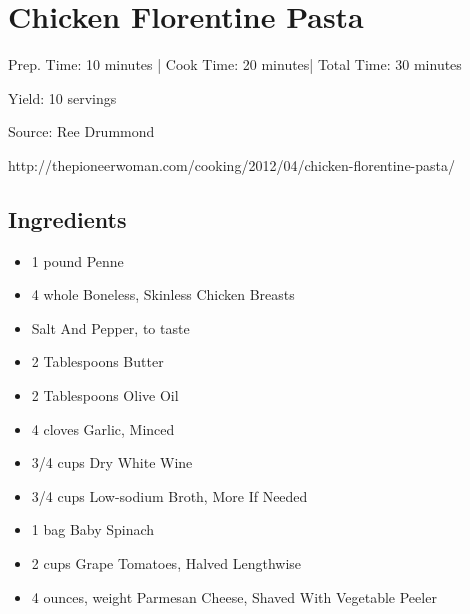 \section{Chicken Florentine Pasta}

\begin{center}
Prep. Time: 10 minutes |
Cook Time: 20 minutes|
Total Time: 30 minutes
 
Yield: 10 servings

\vspace{1em}

Source: Ree Drummond\par
http://thepioneerwoman.com/cooking/2012/04/chicken-florentine-pasta/
\end{center}

\subsection{Ingredients}
\begin{multicols}{2}
\begin{itemize}
    \item 1 pound Penne
    \item 4 whole Boneless, Skinless Chicken Breasts
    \item Salt And Pepper, to taste
    \item 2 Tablespoons Butter
    \item 2 Tablespoons Olive Oil
    \item 4 cloves Garlic, Minced
    \item 3/4 cups Dry White Wine
    \item 3/4 cups Low-sodium Broth, More If Needed
    \item 1 bag Baby Spinach
    \item 2 cups Grape Tomatoes, Halved Lengthwise
    \item 4 ounces, weight Parmesan Cheese, Shaved With Vegetable Peeler
\end{itemize}
\end{multicols}

